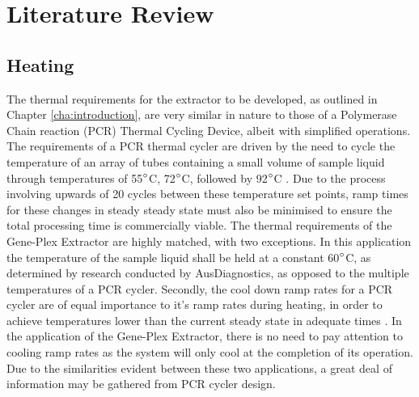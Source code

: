 \chapter{Literature Review}
\label{cha:literaturereview}


\section{Heating}

The thermal requirements for the extractor to be developed, as outlined in Chapter \ref{cha:introduction}, are very similar in nature to those of a Polymerase Chain reaction (PCR) Thermal Cycling Device, albeit with simplified operations. The requirements of a PCR thermal cycler are driven by the need to cycle the temperature of an array of tubes containing a small volume of sample liquid through temperatures of 55$\degree$C, 72$\degree$C, followed by 92$\degree$C \cite{14405884}. Due to the process involving upwards of 20 cycles between these temperature set points, ramp times for these changes in steady steady state must also be minimised to ensure the total processing time is commercially viable. The thermal requirements of the Gene-Plex Extractor are highly matched, with two exceptions. In this application the temperature of the sample liquid shall be held at a constant 60$\degree$C, as determined by research conducted by AusDiagnostics, as opposed to the multiple temperatures of a PCR cycler. Secondly, the cool down ramp rates for a PCR cycler are of equal importance to it's ramp rates during heating, in order to achieve temperatures lower than the current steady state in adequate times \cite{2563996}\cite{15156909}. In the application of the Gene-Plex Extractor, there is no need to pay attention to cooling ramp rates as the system will only cool at the completion of its operation. Due to the similarities evident between these two applications, a great deal of information may be gathered from PCR cycler design.\\

